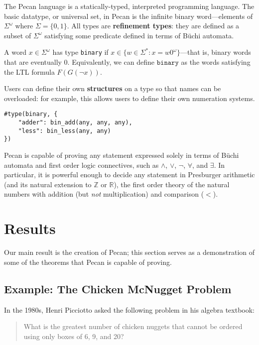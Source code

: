 \documentclass[10pt,usenames,dvipsnames]{article}
\begin{document}
The Pecan language is a statically-typed, interpreted programming language.
The basic datatype, or universal set, in Pecan is the infinite binary word---elements of $\Sigma^{\omega}$ where $\Sigma = \{0,1\}$.
All types are \textbf{refinement types}: they are defined as a subset of $\Sigma^{\omega}$ satisfying some predicate defined in terms of B\"uchi automata.

\begin{example}
A word $x \in \Sigma^\omega$ has type \texttt{binary} if $x \in \{ w \in \Sigma^* : x = w0^\omega \}$---that is, binary words that are eventually $0$.
Equivalently, we can define $\texttt{binary}$ as the words satisfying the LTL formula $F(G(\neg x))$.
\end{example}

Users can define their own \textbf{structures} on a type so that names can be overloaded: for example, this allows users to define their own numeration systems.

\begin{lstlisting}[language=pecan, basicstyle=\normalsize\ttfamily, mathescape=true, frame=single]
#type(binary, {
    "adder": bin_add(any, any, any),
    "less": bin_less(any, any) 
})
\end{lstlisting}

Pecan is capable of proving any statement expressed solely in terms of B\"uchi automata and first order logic connectives, such as $\wedge$, $\vee$, $\neg$, $\forall$, and $\exists$.
In particular, it is powerful enough to decide any statement in Presburger arithmetic (and its natural extension to $\mathbb{Z}$ or $\mathbb{R}$), the first order theory of the natural numbers with addition (but \emph{not} multiplication) and comparison ($<$).

\section{Results}

Our main result is the creation of Pecan; this section serves as a demonstration of some of the theorems that Pecan is capable of proving.

\subsection{Example: The Chicken McNugget Problem }

In the 1980s, Henri Picciotto asked the following problem in his algebra textbook:

\begin{quote}
    What is the greatest number of chicken nuggets that cannot be ordered using only boxes of 6, 9, and 20?
\end{quote}
\end{document}
